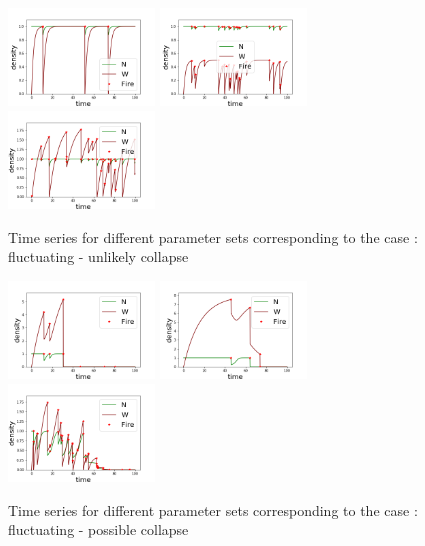 \documentclass{article}
\begin{document}
\begin{figure}[h!]
\centering
\includegraphics[width=3.9cm]{equivalent_low_never_1.png}
\includegraphics[width=3.9cm]{equivalent_low_never_2.png}
\includegraphics[width=3.9cm]{equivalent_low_never_3.png}
\caption{Time series for different parameter sets corresponding to the case : fluctuating - unlikely collapse}
\end{figure}



\begin{figure}[h!]
\centering
\includegraphics[width=3.9cm]{equivalent_low_always_1.png}
\includegraphics[width=3.9cm]{equivalent_low_always_2.png}
\includegraphics[width=3.9cm]{equivalent_low_always_3.png}
\caption{Time series for different parameter sets corresponding to the case : fluctuating - possible collapse}
\end{figure}
\end{document}
